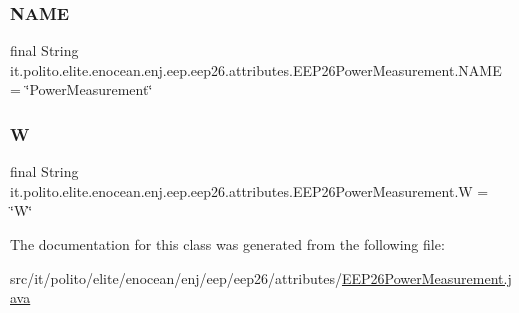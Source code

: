 \hypertarget{classit_1_1polito_1_1elite_1_1enocean_1_1enj_1_1eep_1_1eep26_1_1attributes_1_1_e_e_p26_power_measurement_afbb569921c1be6eeda841101c96062d9}{}\label{classit_1_1polito_1_1elite_1_1enocean_1_1enj_1_1eep_1_1eep26_1_1attributes_1_1_e_e_p26_power_measurement_afbb569921c1be6eeda841101c96062d9} 
\subsubsection{\texorpdfstring{N\+A\+ME}{NAME}}
{\footnotesize\ttfamily final String it.\+polito.\+elite.\+enocean.\+enj.\+eep.\+eep26.\+attributes.\+E\+E\+P26\+Power\+Measurement.\+N\+A\+ME = \char`\"{}Power\+Measurement\char`\"{}\hspace{0.3cm}{\ttfamily [static]}}

\hypertarget{classit_1_1polito_1_1elite_1_1enocean_1_1enj_1_1eep_1_1eep26_1_1attributes_1_1_e_e_p26_power_measurement_a5ad288bd287961f779157699def5fe95}{}\label{classit_1_1polito_1_1elite_1_1enocean_1_1enj_1_1eep_1_1eep26_1_1attributes_1_1_e_e_p26_power_measurement_a5ad288bd287961f779157699def5fe95} 
\subsubsection{\texorpdfstring{W}{W}}
{\footnotesize\ttfamily final String it.\+polito.\+elite.\+enocean.\+enj.\+eep.\+eep26.\+attributes.\+E\+E\+P26\+Power\+Measurement.\+W = \char`\"{}W\char`\"{}\hspace{0.3cm}{\ttfamily [static]}}



The documentation for this class was generated from the following file\+:\begin{DoxyCompactItemize}
\item 
src/it/polito/elite/enocean/enj/eep/eep26/attributes/\hyperlink{_e_e_p26_power_measurement_8java}{E\+E\+P26\+Power\+Measurement.\+java}\end{DoxyCompactItemize}
